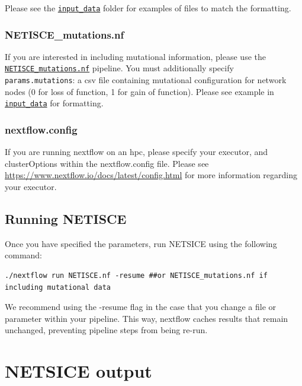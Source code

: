 \documentclass[
]{book}
\begin{document}
Please see the \href{https://github.com/VeraLiconaResearchGroup/Netisce/tree/main/NETISCE_local/input_data}{\texttt{input\_data}} folder for examples of files to match the formatting.

\hypertarget{netisce_mutations.nf}{%
\subsection{NETISCE\_mutations.nf}\label{netisce_mutations.nf}}

If you are interested in including mutational information, please use the \href{https://github.com/VeraLiconaResearchGroup/Netisce/blob/main/NETISCE_local/NETISCE_mutations.nf}{\texttt{NETISCE\_mutations.nf}} pipeline. You must additionally specify \texttt{params.mutations}: a csv file containing mutational configuration for network nodes (0 for loss of function, 1 for gain of function). Please see example in \href{https://github.com/VeraLiconaResearchGroup/Netisce/tree/main/NETISCE_local/input_data}{\texttt{input\_data}} for formatting.

\hypertarget{nextflow.config}{%
\subsection{nextflow.config}\label{nextflow.config}}

If you are running nextflow on an hpc, please specify your executor, and clusterOptions within the nextflow.config file. Please see \url{https://www.nextflow.io/docs/latest/config.html} for more information regarding your executor.

\hypertarget{running-netisce}{%
\section{Running NETISCE}\label{running-netisce}}

Once you have specified the parameters, run NETSICE using the following command:

\begin{verbatim}
./nextflow run NETISCE.nf -resume ##or NETISCE_mutations.nf if including mutational data
\end{verbatim}

We recommend using the -resume flag in the case that you change a file or parameter within your pipeline. This way, nextflow caches results that remain unchanged, preventing pipeline steps from being re-run.

\hypertarget{netsice-output}{%
\chapter{NETSICE output}\label{netsice-output}}
\end{document}
